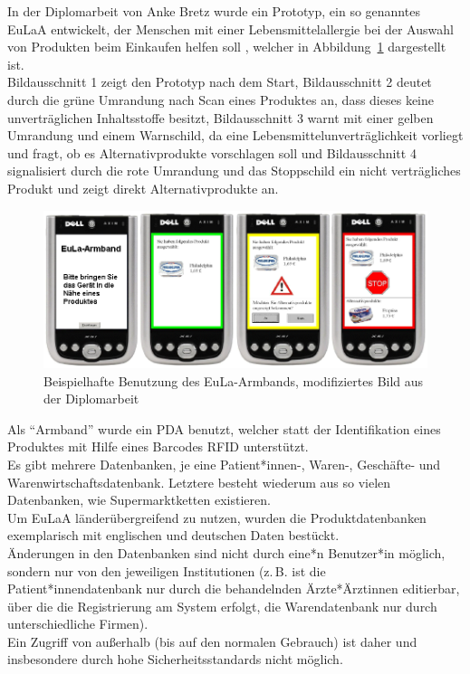 In der Diplomarbeit von Anke Bretz wurde ein Prototyp, ein so
genanntes \ac{EuLaA}
entwickelt, der Menschen mit einer Lebensmittelallergie
bei der Auswahl von Produkten beim Einkaufen helfen soll \cite{bre07},
welcher in Abbildung~\ref{img:eula} dargestellt ist.\\
Bildausschnitt 1 zeigt den Prototyp nach dem Start, Bildausschnitt 2
deutet durch die grüne Umrandung nach Scan eines Produktes an, dass
dieses keine unverträglichen Inhaltsstoffe besitzt, Bildausschnitt 3
warnt mit einer gelben Umrandung und einem Warnschild, da eine
Lebensmittelunverträglichkeit vorliegt und fragt, ob es Alternativprodukte
vorschlagen soll und Bildausschnitt 4 signalisiert durch die rote
Umrandung und das Stoppschild ein nicht verträgliches Produkt und
zeigt direkt Alternativprodukte an.

\begin{figure}[ht]
	\centerline{
	  \includegraphics[scale=0.5]{pics/eula-2.png}
	}
	\caption[Beispielhafte Benutzung des EuLa-Armbands]{Beispielhafte Benutzung des EuLa-Armbands, modifiziertes Bild 
aus der Diplomarbeit \cite{bre07}}
	\label{img:eula}
\end{figure}

Als "`Armband"' wurde ein \ac{PDA} benutzt, welcher
statt der Identifikation eines Produktes mit Hilfe eines Barcodes
\ac{RFID} unterstützt.\\
Es gibt mehrere Datenbanken, je eine Patient*innen-,
Waren-, Geschäfte- und Warenwirtschaftsdatenbank. Letztere besteht
wiederum aus so vielen Datenbanken, wie Supermarktketten existieren.\\
Um \ac{EuLaA} länderübergreifend zu nutzen, wurden die
Produktdatenbanken exemplarisch mit englischen und deutschen Daten
bestückt.\\
Änderungen in den Datenbanken sind nicht durch eine*n Benutzer*in
möglich, sondern nur von den jeweiligen Institutionen
(z.\,B. ist die Patient*innendatenbank nur durch die behandelnden
Ärzte*Ärztinnen
editierbar, über die die Registrierung am System erfolgt,
die Warendatenbank nur durch unterschiedliche Firmen).\\
Ein Zugriff von außerhalb (bis auf den normalen Gebrauch) ist daher und
insbesondere durch hohe Sicherheitsstandards nicht möglich.

